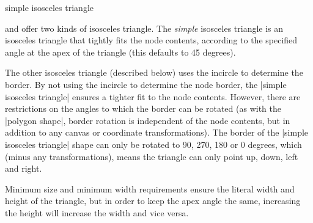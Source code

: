 \begin{shape}{simple isosceles triangle}

	\pgfname{} and \tikzname{} offer two kinds of isosceles triangle. 
	The \emph{simple} isosceles triangle is an isosceles triangle 
	that tightly fits the node contents, according to the specified 
	angle at the apex of the triangle (this defaults to 45 degrees). 

\begin{codeexample}[]
\end{codeexample}	

	The other isosceles triangle (described below) uses the incircle to 
	determine the border. By not using the incircle to determine the node 
	border, the |simple isosceles triangle| ensures a tighter fit to the 
	node contents. However, there are restrictions on the angles to which
	the border can be rotated (as with the |polygon shape|, border 
	rotation is independent of the node contents, but in addition to any 
	canvas or coordinate transformations). 
	The border of the |simple isosceles triangle| shape can only be rotated 
	to 90, 270, 180 or 0 degrees, which (minus any transformations), means
	the triangle can only point up, down, left and right. 

\begin{codeexample}[]
\end{codeexample}

	Minimum size and minimum width requirements ensure the literal 
	width and height of the triangle, but in order to keep the apex 
	angle the same, increasing the height will increase the width 
	and vice versa. 
   

\end{shape}

